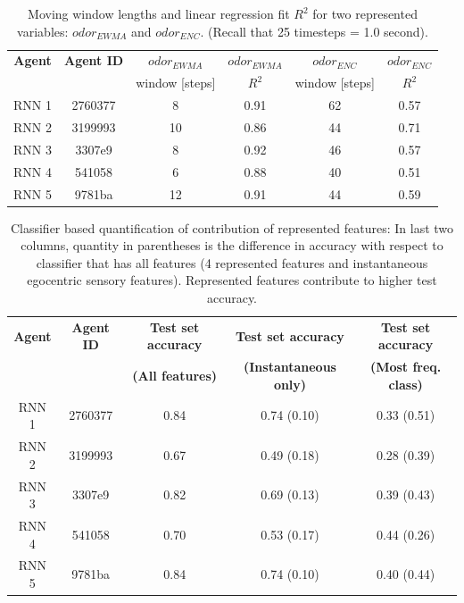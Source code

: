 \documentclass[5p,twocolumn,authoryear]{elsarticle}
\begin{document}
\begin{table}[h!]
    \centering
    \begin{tabular}{cccccc}
     \hline\hline
     \textbf{Agent} & 
     \textbf{Agent ID} & 
     $odor_{EWMA}$ & 
     $odor_{EWMA}$ & 
     $odor_{ENC}$ & 
     $odor_{ENC}$  \\
     & 
     &
     window [steps] & 
     $R^2$ &
     window [steps] &
     $R^2$ \\
     \hline   
        RNN 1 & 2760377 & 8  & 0.91 & 62 & 0.57 \\ \hline
        RNN 2 & 3199993 & 10 & 0.86 & 44 & 0.71 \\ \hline  
        RNN 3 & 3307e9  & 8  & 0.92 & 46 & 0.57 \\ \hline
        RNN 4 & 541058  & 6  & 0.88 & 40 & 0.51 \\ \hline
        RNN 5 & 9781ba  & 12 & 0.91 & 44 & 0.59 \\ \hline
     \hline
    \end{tabular}
    \caption{Moving window lengths and linear regression fit $R^2$ for two represented variables: $odor_{EWMA}$ and $odor_{ENC}$. 
    (Recall that 25 timesteps = 1.0 second).
    }
\label{table_supp_ewma}
\end{table}

\begin{table}[h!]
    \centering
    \begin{tabular}{ccccc}
     \hline\hline
     \textbf{Agent} & \textbf{Agent ID} & \textbf{Test set accuracy} & \textbf{Test set accuracy} & \textbf{Test set accuracy}   \\
     & & \textbf{(All features)} & \textbf{(Instantaneous only)} & \textbf{(Most freq. class)}   \\
     \hline   
        RNN 1 & 2760377 & 0.84 & 0.74 (0.10) & 0.33 (0.51) \\ \hline
        RNN 2 & 3199993 & 0.67 & 0.49 (0.18) & 0.28 (0.39) \\ \hline  
        RNN 3 & 3307e9 & 0.82 & 0.69 (0.13) & 0.39 (0.43) \\ \hline
        RNN 4 & 541058 & 0.70 & 0.53 (0.17) & 0.44 (0.26) \\ \hline
        RNN 5 & 9781ba & 0.84 & 0.74 (0.10) & 0.40 (0.44) \\ \hline
     \hline
    \end{tabular}
    \caption{Classifier based quantification of contribution of represented features: 
    In last two columns, quantity in parentheses is the difference in accuracy with respect to classifier that has all features (4 represented features and instantaneous egocentric sensory features). 
    Represented features contribute to higher test accuracy. 
    }
\label{table_supp_repr}
\end{table}
\end{document}
